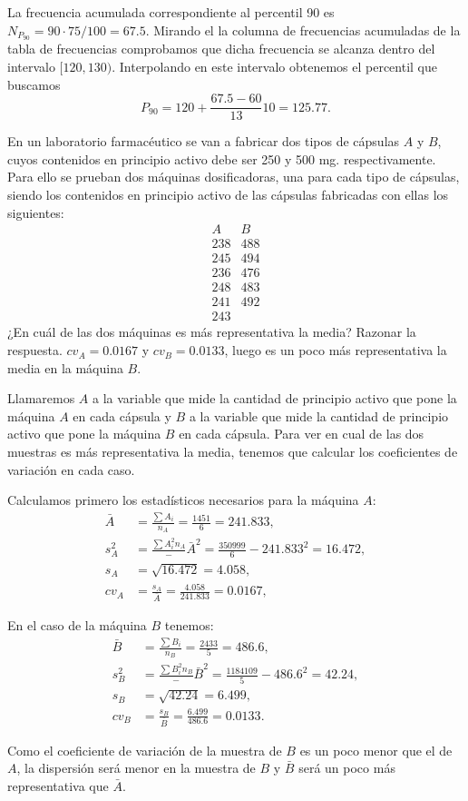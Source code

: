 {\begin{enumerate}
La frecuencia acumulada correspondiente al percentil 90 es $N_{P_{90}}=90\cdot 75/100=67.5$. Mirando el la  columna de frecuencias acumuladas de la tabla de frecuencias comprobamos que dicha frecuencia se alcanza dentro del intervalo $[120,130)$.
Interpolando en este intervalo obtenemos el percentil que buscamos \[P_{90}=120+\frac{67.5-60}{13}10=125.77.\]
\end{enumerate}
}


{En un laboratorio farmacéutico se van a fabricar dos tipos de cápsulas $A$ y $B$, cuyos contenidos en principio
activo debe ser 250 y 500 mg. respectivamente. Para ello se prueban dos máquinas dosificadoras, una para cada tipo de
cápsulas, siendo los contenidos en principio activo de las cápsulas fabricadas con ellas los siguientes:
\[
\begin{array}{c|c}
A & B  \\ \hline
238 & 488  \\
245 & 494  \\
236 & 476  \\
248 & 483  \\
241 & 492  \\
243 &
\end{array}
 \]
¿En cuál de las dos máquinas es más representativa la media?
Razonar la respuesta.
}
{$cv_{A} = 0.0167$ y $cv_{B}=0.0133$, luego es un poco más representativa la media en la máquina $B$. 
}
{Llamaremos $A$ a la variable que mide la cantidad de principio activo que pone la máquina $A$ en cada cápsula y $B$ a la variable que mide la cantidad de principio activo que pone la máquina $B$ en cada cápsula.
Para ver en cual de las dos muestras es más representativa la media, tenemos que calcular los coeficientes de variación en cada caso. 

Calculamos primero los estadísticos necesarios para la máquina $A$:
\begin{align*}
\bar{A} & = \frac{\sum A_{i}}{n_{A}}=\frac{1451}{6}=241.833,\\
s_{A}^2 & =  \frac{\sum{A_{i}^2}{n_{A}}}-\bar{A}^2= \frac{350999}{6}-241.833^2=16.472,\\
s_{A} & = \sqrt{16.472}= 4.058,\\
cv_{A} & = \frac{s_{A}}{\bar{A}}=\frac{4.058}{241.833}=0.0167,
\end{align*}

En el caso de la máquina $B$ tenemos:
\begin{align*}
\bar{B} & = \frac{\sum B_{i}}{n_{B}}=\frac{2433}{5}=486.6,\\
s_{B}^2 & = \frac{\sum{B_{i}^2}{n_{B}}}-\bar{B}^2= \frac{1184109}{5}-486.6^2=42.24,\\
s_{B} & = \sqrt{42.24}= 6.499,\\
cv_{B} & = \frac{s_{B}}{\bar{B}}=\frac{6.499}{486.6}=0.0133.
\end{align*}

Como el coeficiente de variación de la muestra de $B$ es un poco menor que el de $A$, la dispersión será menor en la muestra de $B$ y $\bar{B}$ será un poco más representativa que $\bar{A}$.
}


